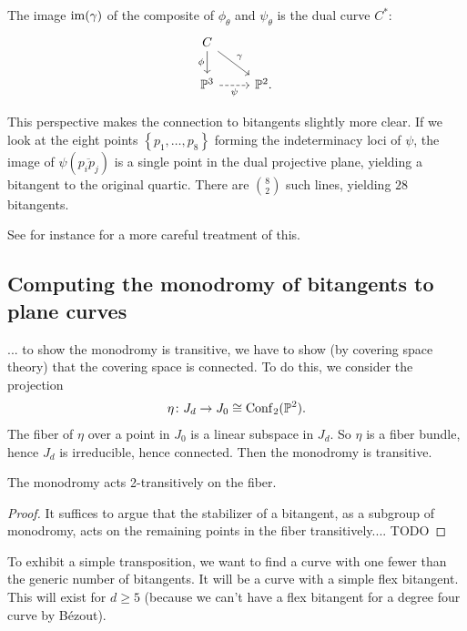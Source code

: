 \documentclass[11pt]{amsart}
\providecommand{\Conf}{\mathrm{Conf}}
\begin{document}
\begin{proposition} The image $\mathrm{im}(\gamma)$ of the composite of $\phi_\theta$ and $\psi_\theta$ is the dual curve $C^\ast$:
\[ \begin{tikzcd}
    C\ar[dr,"\gamma"]\dar["\phi" left] & \\
    \P^3\rar[dashed,"\psi" below] & \P^2.
\end{tikzcd} \]
\end{proposition}

This perspective makes the connection to bitangents slightly more clear. If we look at the eight points $\left\{ p_1, \ldots, p_8 \right\}$ forming the indeterminacy loci of $\psi$, the image of $\psi(\overline{p_i p_j})$ is a single point in the dual projective plane, yielding a bitangent to the original quartic. There are $\binom{8}{2}$ such lines, yielding $28$ bitangents.

See for instance \cite[\S2]{Sameera-theta} for a more careful treatment of this.







\subsection{Computing the monodromy of bitangents to plane curves}




... to show the monodromy is transitive, we have to show (by covering space theory) that the covering space is connected. To do this, we consider the projection
\begin{align*}
    \eta \colon J_d \to J_0 \cong \Conf_2(\P^2).
\end{align*}
The fiber of $\eta$ over a point in $J_0$ is a linear subspace in $J_d$. So $\eta$ is a fiber bundle, hence $J_d$ is irreducible, hence connected. Then the monodromy is transitive.

\begin{proposition} The monodromy acts 2-transitively on the fiber.
\end{proposition}
\begin{proof} It suffices to argue that the stabilizer of a bitangent, as a subgroup of monodromy, acts on the remaining points in the fiber transitively.... TODO
\end{proof}


To exhibit a simple transposition, we want to find a curve with one fewer than the generic number of bitangents. It will be a curve with a simple flex bitangent. This will exist for $d \ge 5$ (because we can't have a flex bitangent for a degree four curve by B\'{e}zout).
\end{document}
